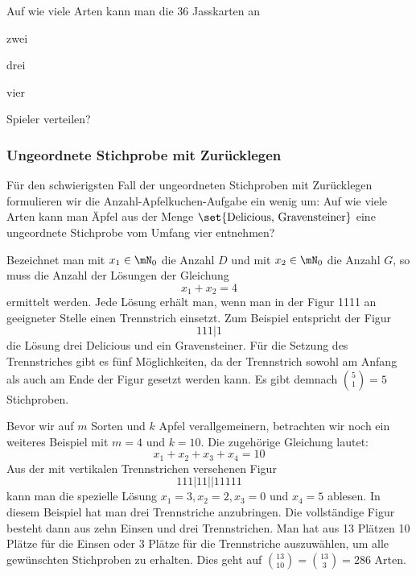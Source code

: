 \documentclass[%
11pt,%
twoside,%
titlepage,%
german,%
headsepline%
]{scrartcl}
\begin{document}
\begin{ueb}[Jass]
Auf wie viele Arten kann man die 36 Jasskarten an

\begin{minipage}{2cm}
\begin{enumeratea}
\item zwei
\end{enumeratea}
\end{minipage}
\begin{minipage}{2cm}
\begin{enumeratea}
\addtocounter{enumi}{1}
\item drei
\end{enumeratea}
\end{minipage}
\begin{minipage}{2cm}
\begin{enumeratea}
\addtocounter{enumi}{2}
\item vier
\end{enumeratea}
\end{minipage}

Spieler verteilen?
\end{ueb}

\subsubsection{Ungeordnete Stichprobe mit Zurücklegen}
Für den schwierigsten Fall der ungeordneten Stichproben mit Zurücklegen formulieren wir die Anzahl-Apfelkuchen-Aufgabe ein wenig um: Auf wie viele Arten kann man \"Apfel aus der Menge $\set{\text{Delicious, Gravensteiner}}$ eine ungeordnete Stichprobe vom Umfang vier entnehmen?

Bezeichnet man mit $x_1\in\mN_0$ die Anzahl $D$ und mit $x_2\in\mN_0$ die Anzahl $G$, so muss die Anzahl der Lösungen der Gleichung $$x_1+x_2=4$$ ermittelt werden. Jede Lösung erhält man, wenn man in der Figur 1111 an geeigneter Stelle einen Trennstrich einsetzt. Zum Beispiel entspricht der Figur $$111|1$$ die Lösung drei Delicious und ein Gravensteiner. Für die Setzung des Trennstriches gibt es fünf Möglichkeiten, da der Trennstrich sowohl am Anfang als auch am Ende der Figur gesetzt werden kann. Es gibt demnach $\binom{5}{1}=5$ Stichproben.

Bevor wir auf $m$ Sorten und $k$ Apfel verallgemeinern, betrachten wir noch ein weiteres Beispiel mit $m=4$ und $k=10$. Die zugehörige Gleichung lautet: $$x_1+x_2+x_3+x_4=10$$ Aus der mit vertikalen Trennstrichen versehenen Figur $$111|11||11111$$ kann man die spezielle Lösung $x_1 = 3, x_2 = 2, x_3 = 0$ und $x_4 = 5$ ablesen. In diesem Beispiel hat man drei Trennstriche anzubringen. Die vollständige Figur besteht dann aus zehn Einsen und drei Trennstrichen. Man hat aus 13 Plätzen 10 Plätze für die Einsen oder 3 Plätze für die Trennstriche
auszuwählen, um alle gewünschten Stichproben zu erhalten. Dies geht auf $\binom{13}{10}=\binom{13}{3}=286$ Arten.
\end{document}
